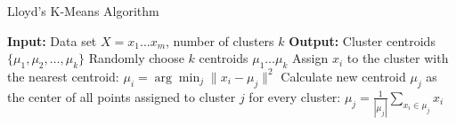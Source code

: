 \documentclass[
    fontsize=12pt,
    headings=small,
    parskip=half,           %
    bibliography=totoc,
    numbers=noenddot,       %
    open=any,               %
    ]{scrreprt}
\begin{document}
\begin{algorithm}
	\label{fig:kmeans}
	\caption{Lloyd's K-Means Algorithm}
	\begin{algorithmic}[1]
		\State \textbf{Input:} Data set $X = {x_1 \ldots x_m}$, number of clusters $k$
		\State \textbf{Output:} Cluster centroids $\{\mu_1, \mu_2, \ldots, \mu_k\}$
		\State Randomly choose $k$ centroids ${\mu_1 \ldots \mu_k}$ 
		\Repeat
			\State Assign $x_i$ to the cluster with the nearest centroid: $\mu_i = \arg\min_j \|x_i - \mu_j\|^2$
		\EndFor
			\State Calculate new centroid $\mu_j$ as the center of all points assigned to cluster $j$ for every cluster: $\mu_j = \frac{1}{|\mu_j|} \sum_{x_i \in \mu_j} x_i$
		\EndFor
	\end{algorithmic}
\end{algorithm}
\end{document}
